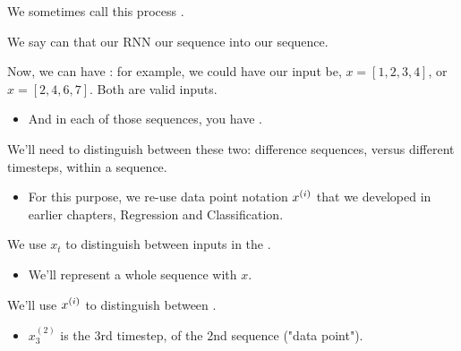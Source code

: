         We sometimes call this process .\\

        \begin{definition}
            We say can that our RNN  our  sequence into our  sequence.
        \end{definition}

        Now, we can have : for example, we could have our input be, $x=[1,2,3,4]$, or $x=[2,4,6,7]$. Both are valid inputs.
        
        \begin{itemize}
            \item And in each of those sequences, you have .
        \end{itemize} 
            

        We'll need to distinguish between these two: difference sequences, versus different timesteps, within a sequence.

        \begin{itemize}
            \item For this purpose, we re-use data point notation $x^{(i)}$ that we developed in earlier chapters, Regression and Classification.\\
        \end{itemize}

            
            

        \begin{notation}
            We use $x_t$ to distinguish between inputs in the .

            \begin{itemize}
                \item We'll represent a whole sequence with $x$.
            \end{itemize}

            We'll use $x^{(i)}$ to distinguish between .
        \end{notation}

        \begin{itemize}
            \item \miniex $x_3^{(2)}$ is the 3rd timestep, of the 2nd sequence ("data point").
        \end{itemize}

